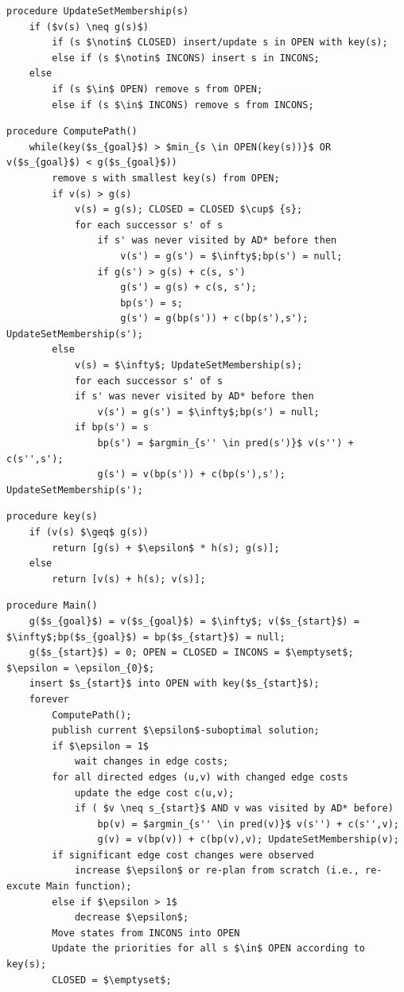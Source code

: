 \begin{lstlisting}[mathescape, label=lst-dinamicos-ad-set, caption=Algoritmo AD* - função para determinar o conjunto ao qual vértice pertencerá, float=htpb]
procedure UpdateSetMembership(s)
	if ($v(s) \neq g(s)$)
		if (s $\notin$ CLOSED) insert/update s in OPEN with key(s);
		else if (s $\notin$ INCONS) insert s in INCONS;
	else
		if (s $\in$ OPEN) remove s from OPEN;
		else if (s $\in$ INCONS) remove s from INCONS;
\end{lstlisting}

\begin{lstlisting}[mathescape, label=lst-dinamicos-ad-computepath, caption=Algoritmo AD* - função de cálculo de caminho, float=htpb]
procedure ComputePath()
	while(key($s_{goal}$) > $min_{s \in OPEN(key(s))}$ OR v($s_{goal}$) < g($s_{goal}$)) 
		remove s with smallest key(s) from OPEN;
		if v(s) > g(s)
			v(s) = g(s); CLOSED = CLOSED $\cup$ {s};
			for each successor s' of s
				if s' was never visited by AD* before then
					v(s') = g(s') = $\infty$;bp(s') = null;
				if g(s') > g(s) + c(s, s')
					g(s') = g(s) + c(s, s');
					bp(s') = s;
					g(s') = g(bp(s')) + c(bp(s'),s'); UpdateSetMembership(s');
		else
			v(s) = $\infty$; UpdateSetMembership(s);
			for each successor s' of s
			if s' was never visited by AD* before then
				v(s') = g(s') = $\infty$;bp(s') = null;
			if bp(s') = s
				bp(s') = $argmin_{s'' \in pred(s')}$ v(s'') + c(s'',s');
				g(s') = v(bp(s')) + c(bp(s'),s'); UpdateSetMembership(s');
\end{lstlisting}

\begin{lstlisting}[mathescape, label=lst-dinamicos-ad-key, caption=Algoritmo AD* - função da chave ordenadora da fila de prioridades, float=htpb]
procedure key(s)
	if (v(s) $\geq$ g(s))
		return [g(s) + $\epsilon$ * h(s); g(s)];
	else
		return [v(s) + h(s); v(s)];
\end{lstlisting}

\begin{lstlisting}[mathescape, label=lst-dinamicos-ad-main, caption=Algoritmo AD* - função principal, float=htpb]
procedure Main()
	g($s_{goal}$) = v($s_{goal}$) = $\infty$; v($s_{start}$) = $\infty$;bp($s_{goal}$) = bp($s_{start}$) = null;
	g($s_{start}$) = 0; OPEN = CLOSED = INCONS = $\emptyset$; $\epsilon = \epsilon_{0}$;
	insert $s_{start}$ into OPEN with key($s_{start}$);
	forever
		ComputePath();
		publish current $\epsilon$-suboptimal solution;
		if $\epsilon = 1$
			wait changes in edge costs;
		for all directed edges (u,v) with changed edge costs
			update the edge cost c(u,v);
			if ( $v \neq s_{start}$ AND v was visited by AD* before)
				bp(v) = $argmin_{s'' \in pred(v)}$ v(s'') + c(s'',v);
				g(v) = v(bp(v)) + c(bp(v),v); UpdateSetMembership(v);
		if significant edge cost changes were observed
			increase $\epsilon$ or re-plan from scratch (i.e., re-excute Main function);
		else if $\epsilon > 1$
			decrease $\epsilon$;
		Move states from INCONS into OPEN
		Update the priorities for all s $\in$ OPEN according to key(s);
		CLOSED = $\emptyset$;
\end{lstlisting}

